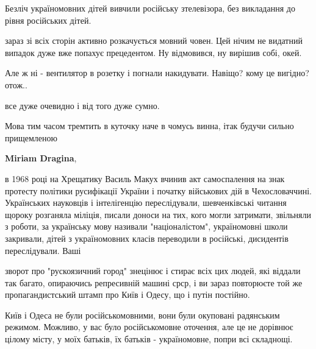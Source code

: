 \begin{itemize}
\begin{itemize}
Безліч україномовних дітей вивчили російську зтелевізора, без викладання до
рівня російських дітей.
\end{itemize}

 

зараз зі всіх сторін активно розкачується мовний човен. Цей нічим не видатний
випадок дуже вже попахує прецедентом. Ну відмовився, ну вирішив собі, окей.

Але ж ні - вентилятор в розетку і погнали накидувати. Навіщо? кому це вигідно?
отож..

все дуже очевидно і від того дуже сумно.

Мова тим часом тремтить в куточку наче в чомусь винна, ітак будучи сильно
прищемленою


 
\textbf{Miriam Dragina}, 

в 1968 році на Хрещатику Василь Макух вчинив акт самоспалення на знак протесту
політики русифікації України і початку військових дій в Чехословаччині.
Українських науковців і інтелігенцію переслідували, шевченківські читання
щороку розганяла міліція, писали доноси на тих, кого могли затримати, звільняли
з роботи, за українську мову називали "націоналістом", україномовні школи
закривали, дітей з україномовних класів переводили в російські, дисидентів
переслідували. Ваші

зворот про "рускоязичний город" знецінює і стирає всіх цих людей, які віддали
так багато, опираючись репресивній машині срср, і ви зараз повторюєте той же
пропагандистський штамп про Київ і Одесу, що і путін постійно. 

Київ і Одеса не були російськомовними, вони були окуповані радянським режимом.
Можливо, у вас було російськомовне оточення, але це не дорівнює цілому місту, у
моїх батьків, їх батьків - україномовне, попри всі складнощі.

\begin{itemize}
 

\end{itemize}
\end{itemize}
